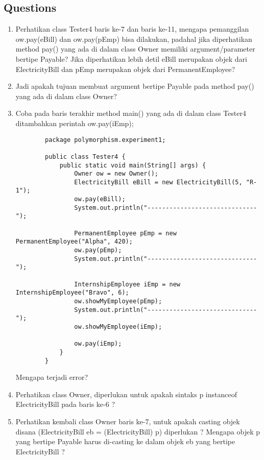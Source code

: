 \documentclass[12pt,titlepage]{article}
\begin{document}
\subsection{Questions}
\begin{enumerate}
    \item Perhatikan class Tester4 baris ke-7 dan baris ke-11, mengapa pemanggilan ow.pay(eBill) dan ow.pay(pEmp) bisa dilakukan, padahal jika diperhatikan method pay() yang ada di dalam class Owner memiliki argument/parameter bertipe Payable? Jika diperhatikan lebih detil eBill merupakan objek dari ElectricityBill dan pEmp merupakan objek dari PermanentEmployee?
    \item Jadi apakah tujuan membuat argument bertipe Payable pada method pay() yang ada di dalam class Owner?
    \item Coba pada baris terakhir method main() yang ada di dalam class Tester4 ditambahkan perintah ow.pay(iEmp);
    \begin{verbatim}
        package polymorphism.experiment1;
    
        public class Tester4 {
            public static void main(String[] args) {
                Owner ow = new Owner();
                ElectricityBill eBill = new ElectricityBill(5, "R-1");
                ow.pay(eBill);
                System.out.println("------------------------------");
                
                PermanentEmployee pEmp = new PermanentEmployee("Alpha", 420);
                ow.pay(pEmp);
                System.out.println("------------------------------");
                
                InternshipEmployee iEmp = new InternshipEmployee("Bravo", 6);
                ow.showMyEmployee(pEmp);
                System.out.println("------------------------------");
                ow.showMyEmployee(iEmp);

                ow.pay(iEmp);
            }
        }
    \end{verbatim}
    Mengapa terjadi error?
    \item Perhatikan class Owner, diperlukan untuk apakah sintaks p instanceof ElectricityBill pada baris ke-6 ?
    \item Perhatikan kembali class Owner baris ke-7, untuk apakah casting objek disana (ElectricityBill eb = (ElectricityBill) p) diperlukan ? Mengapa objek p yang bertipe Payable harus di-casting ke dalam objek eb yang bertipe ElectricityBill ?
\end{enumerate}
\end{document}
